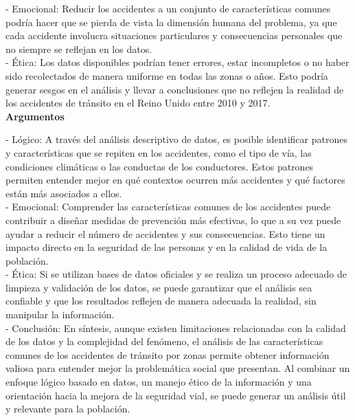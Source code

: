\documentclass[12pt]{article}
\begin{document}
\begin{itemize}
    - Emocional: Reducir los accidentes a un conjunto de características comunes podría hacer que se pierda de vista la dimensión humana del problema, ya que cada accidente involucra situaciones particulares y consecuencias personales que no siempre se reflejan en los datos. \\
    
    - Ética: Los datos disponibles podrían tener errores, estar incompletos o no haber sido recolectados de manera uniforme en todas las zonas o años. Esto podría generar sesgos en el análisis y llevar a conclusiones que no reflejen la realidad de los accidentes de tránsito en el Reino Unido entre 2010 y 2017. \\
    
    \textbf{Argumentos} 
    
    - Lógico: A través del análisis descriptivo de datos, es posible identificar patrones y características que se repiten en los accidentes, como el tipo de vía, las condiciones climáticas o las conductas de los conductores. Estos patrones permiten entender mejor en qué contextos ocurren más accidentes y qué factores están más asociados a ellos.\\
    
    - Emocional: Comprender las características comunes de los accidentes puede contribuir a diseñar medidas de prevención más efectivas, lo que a su vez puede ayudar a reducir el número de accidentes y sus consecuencias. Esto tiene un impacto directo en la seguridad de las personas y en la calidad de vida de la población. \\
    
    - Ética: Si se utilizan bases de datos oficiales y se realiza un proceso adecuado de limpieza y validación de los datos, se puede garantizar que el análisis sea confiable y que los resultados reflejen de manera adecuada la realidad, sin manipular la información.\\
    
    - Conclusión: En síntesis, aunque existen limitaciones relacionadas con la calidad de los datos y la complejidad del fenómeno, el análisis de las características comunes de los accidentes de tránsito por zonas permite obtener información valiosa para entender mejor la problemática social que presentan. Al combinar un enfoque lógico basado en datos, un manejo ético de la información y una orientación hacia la mejora de la seguridad vial, se puede generar un análisis útil y relevante para la población.  \\
   

\end{itemize}
\end{document}

